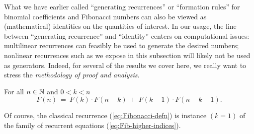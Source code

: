 What we have earlier called ``generating recurrences'' or ``formation rules'' for binomial coefficients and Fibonacci numbers can also be viewed as (mathematical) identities on the quantities of interest.  In our usage, the line between ``generating recurrence'' and ``identity'' centers on computational issues: multilinear recurrences can feasibly be used to generate the desired numbers; nonlinear recurrences such as we expose in this subsection will likely not be used as generators.  Indeed, for several of the results we cover here, we really want to stress the {\em methodology of proof and analysis}.

\begin{prop}
\label{thm:Fib-higher-indices}
For all $n \in \mathbb{N}$ and $0 < k < n$
\begin{equation}
\label{eq:Fib-higher-indices}
F(n) \ = \ F(k) \cdot F(n-k) \ + \ F(k-1) \cdot F(n-k-1).
\end{equation}
\end{prop}

Of course, the classical recurrence (\ref{eq:Fibonacci-defn}) is instance $(k = 1)$ of the family of recurrent equations (\ref{eq:Fib-higher-indices}).

